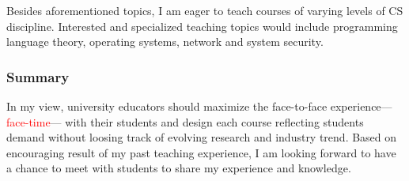 \documentclass[letterpaper, 10pt]{article}
\newcommand{\jikk}[1]{{---\textcolor{red}{#1}---}}
\newcommand{\jikk}[1]{}
\begin{document}
\begin{small}
Besides aforementioned topics, I am eager to teach courses of varying levels
of CS discipline. Interested and specialized teaching topics would include
programming language theory, operating systems, network and system
security.

\subsubsection*{Summary}

In my view, university educators should maximize the face-to-face
experience\jikk{face-time} with their students and design each course
reflecting students demand without loosing track of evolving
research and industry trend.
%
Based on encouraging result of my past teaching experience, I am looking
forward to have a chance to meet with students to share my experience and
knowledge. 

\end{small}
\end{document}
